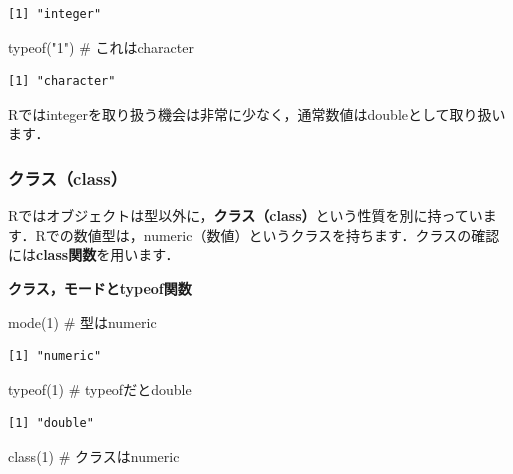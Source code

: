 \documentclass[
  letterpaper,
  DIV=11,
  numbers=noendperiod]{scrreprt}
\newenvironment{Shaded}{\begin{snugshade}}{\end{snugshade}}
\newcommand{\CommentTok}[1]{\textcolor[rgb]{0.37,0.37,0.37}{#1}}
\newcommand{\DecValTok}[1]{\textcolor[rgb]{0.68,0.00,0.00}{#1}}
\newcommand{\FunctionTok}[1]{\textcolor[rgb]{0.28,0.35,0.67}{#1}}
\newcommand{\NormalTok}[1]{\textcolor[rgb]{0.00,0.23,0.31}{#1}}
\newcommand{\StringTok}[1]{\textcolor[rgb]{0.13,0.47,0.30}{#1}}
\begin{document}
\begin{verbatim}
[1] "integer"
\end{verbatim}

\begin{Shaded}
\begin{Highlighting}[]
\FunctionTok{typeof}\NormalTok{(}\StringTok{"1"}\NormalTok{) }\CommentTok{\# これはcharacter}
\end{Highlighting}
\end{Shaded}

\begin{verbatim}
[1] "character"
\end{verbatim}

Rではintegerを取り扱う機会は非常に少なく，通常数値はdoubleとして取り扱います．

\hypertarget{ux30afux30e9ux30b9class}{%
\subsubsection{クラス（class）}\label{ux30afux30e9ux30b9class}}

Rではオブジェクトは型以外に，\textbf{クラス（class）}という性質を別に持っています．Rでの数値型は，numeric（数値）というクラスを持ちます．クラスの確認には\textbf{class関数}を用います．

\textbf{クラス，モードとtypeof関数}

\begin{Shaded}
\begin{Highlighting}[]
\FunctionTok{mode}\NormalTok{(}\DecValTok{1}\NormalTok{) }\CommentTok{\# 型はnumeric}
\end{Highlighting}
\end{Shaded}

\begin{verbatim}
[1] "numeric"
\end{verbatim}

\begin{Shaded}
\begin{Highlighting}[]
\FunctionTok{typeof}\NormalTok{(}\DecValTok{1}\NormalTok{) }\CommentTok{\# typeofだとdouble}
\end{Highlighting}
\end{Shaded}

\begin{verbatim}
[1] "double"
\end{verbatim}

\begin{Shaded}
\begin{Highlighting}[]
\FunctionTok{class}\NormalTok{(}\DecValTok{1}\NormalTok{) }\CommentTok{\# クラスはnumeric}
\end{Highlighting}
\end{Shaded}
\end{document}
